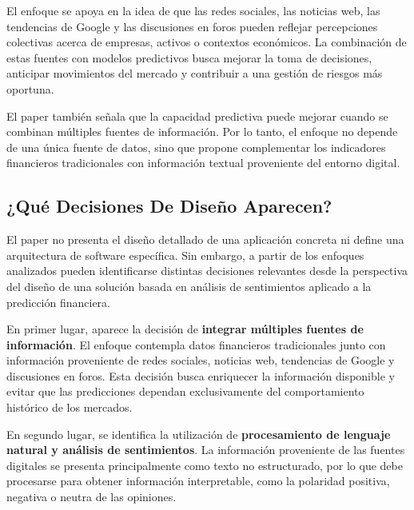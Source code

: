 \vspace{2mm}

El enfoque se apoya en la idea de que las redes sociales, las noticias web, las tendencias de Google y las discusiones en foros pueden reflejar percepciones colectivas acerca de empresas, activos o contextos económicos. La combinación de estas fuentes con modelos predictivos busca mejorar la toma de decisiones, anticipar movimientos del mercado y contribuir a una gestión de riesgos más oportuna.

\vspace{2mm}

El paper también señala que la capacidad predictiva puede mejorar cuando se combinan múltiples fuentes de información. Por lo tanto, el enfoque no depende de una única fuente de datos, sino que propone complementar los indicadores financieros tradicionales con información textual proveniente del entorno digital.


\subsection{¿Qué Decisiones De Diseño Aparecen?}
\vspace{2mm}

El paper no presenta el diseño detallado de una aplicación concreta ni define una arquitectura de software específica. Sin embargo, a partir de los enfoques analizados pueden identificarse distintas decisiones relevantes desde la perspectiva del diseño de una solución basada en análisis de sentimientos aplicado a la predicción financiera.

\vspace{2mm}

En primer lugar, aparece la decisión de \textbf{integrar múltiples fuentes de información}. El enfoque contempla datos financieros tradicionales junto con información proveniente de redes sociales, noticias web, tendencias de Google y discusiones en foros. Esta decisión busca enriquecer la información disponible y evitar que las predicciones dependan exclusivamente del comportamiento histórico de los mercados.

\vspace{2mm}

En segundo lugar, se identifica la utilización de \textbf{procesamiento de lenguaje natural y análisis de sentimientos}. La información proveniente de las fuentes digitales se presenta principalmente como texto no estructurado, por lo que debe procesarse para obtener información interpretable, como la polaridad positiva, negativa o neutra de las opiniones.

